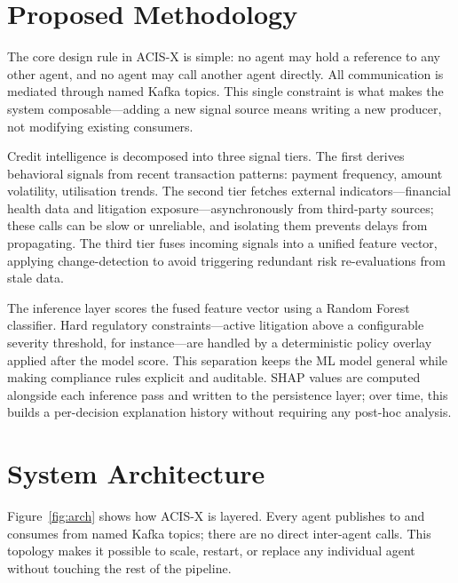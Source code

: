 \documentclass[runningheads]{llncs}
\begin{document}
\section{Proposed Methodology}

The core design rule in ACIS-X is simple: no agent may hold a reference to any other agent, and no agent may call another agent directly. All communication is mediated through named Kafka topics. This single constraint is what makes the system composable---adding a new signal source means writing a new producer, not modifying existing consumers.

Credit intelligence is decomposed into three signal tiers. The first derives behavioral signals from recent transaction patterns: payment frequency, amount volatility, utilisation trends. The second tier fetches external indicators---financial health data and litigation exposure---asynchronously from third-party sources; these calls can be slow or unreliable, and isolating them prevents delays from propagating. The third tier fuses incoming signals into a unified feature vector, applying change-detection to avoid triggering redundant risk re-evaluations from stale data.

The inference layer scores the fused feature vector using a Random Forest classifier. Hard regulatory constraints---active litigation above a configurable severity threshold, for instance---are handled by a deterministic policy overlay applied after the model score. This separation keeps the ML model general while making compliance rules explicit and auditable. SHAP values are computed alongside each inference pass and written to the persistence layer; over time, this builds a per-decision explanation history without requiring any post-hoc analysis.

\section{System Architecture}

Figure~\ref{fig:arch} shows how ACIS-X is layered. Every agent publishes to and consumes from named Kafka topics; there are no direct inter-agent calls. This topology makes it possible to scale, restart, or replace any individual agent without touching the rest of the pipeline.
\end{document}
